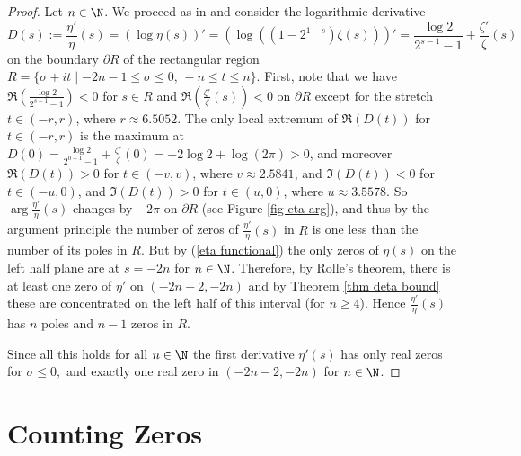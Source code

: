 \documentclass{amsart}
\theoremstyle{plain}
\theoremstyle{definition}
\begin{document}
\begin{proof} Let \(n\in\N\).
We proceed as in \cite[Proof of Theorem 9]{lm:1} and consider the logarithmic derivative 
\[
D(s):=
\frac{\eta'}{\eta}(s)=\left(\log\eta(s)\right)'
=\left(\log\left((1-2^{1-s})\zeta(s)\right)\right)'
=\frac{\log 2}{2^{s-1}-1}+\frac{\zeta'}{\zeta}(s)
\]
on the boundary \(\partial R\) of the rectangular region \(R=\{\sigma + it\mid -2n-1\le \sigma\le 0,\, -n\le t \le n\}\).
First, note that we have $\Re\left(\frac{\log 2}{2^{s-1}-1}\right)<0$ for \(s\in R\) and \(\Re(\frac{\zeta'}{\zeta}(s)) < 0\)  
on \(\partial R\) except for the stretch \(t\in (-r,r)\), where \(r\approx6.5052\).
The only local extremum of \(\Re(D(t))\) for \(t\in(-r,r)\) is the maximum at  
\(D(0)=\frac{\log 2}{2^{0-1}-1}+\frac{\zeta'}{\zeta}(0)=-2\log 2+\log(2\pi)>0\),
and moreover \(\Re(D(t))>0\) for \(t\in (-v,v)\), where \(v\approx 2.5841\),
and \(\Im(D(t))<0\) for \(t\in(-u,0)\), and \(\Im(D(t))>0\) for \(t\in(u,0)\),
where \(u\approx 3.5578\).
So \(\arg \frac{\eta'}{\eta}(s)\) changes by \(-2\pi\) on \(\partial R\) (see Figure \ref{fig eta arg}), and thus by the argument principle the number of zeros of \(\frac{\eta'}{\eta}(s)\) in \(R\) is one 
less than the number of its poles in \(R\).
But by (\ref{eta functional}) the only zeros of \(\eta(s)\) on the left half plane are at $s = -2n$ for $n\in\N$. Therefore, by Rolle's theorem, there is at least one zero of \(\eta'\) on $(-2n-2,-2n)$ and by Theorem \ref{thm deta bound} these are concentrated on the left half of this interval (for \(n\ge 4\)).
Hence \(\frac{\eta'}{\eta}(s)\) has \(n\) poles and \(n-1\) zeros in \(R\).

Since all this holds for all \(n\in\N\) the first derivative $\eta'(s)$ has only real zeros for $\sigma \leq 0,$ and exactly one real zero in $(-2n-2,-2n)$ for  $n\in\N$.
\end{proof}


\section{Counting Zeros}\label{sec eta number}
\end{document}
